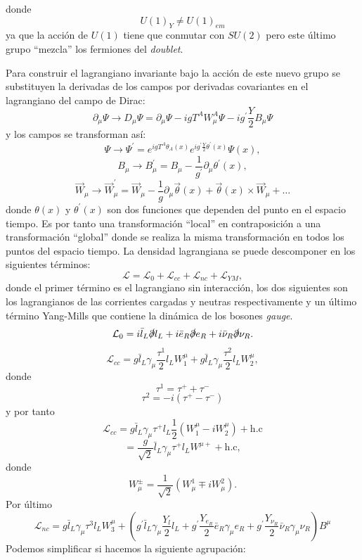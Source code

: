 \documentclass{article}
\theoremstyle{plain}
\theoremstyle{definition}
\begin{document}
	donde \[
	U(1)_Y \neq U(1)_{em}
	\]
	ya que la acción de \(U(1)\) tiene que conmutar con \(SU(2)\) pero este último grupo ``mezcla'' los fermiones  del \textit{doublet}.\par 
	Para construir el lagrangiano invariante bajo la acción de este nuevo grupo se substituyen la derivadas de los campos por derivadas covariantes en el lagrangiano del campo de Dirac:
	\[
	\partial_{\mu}\Psi\rightarrow D_\mu\Psi = \partial_{\mu}\Psi - igT^AW_\mu^A\Psi -ig^\prime \frac{Y}{2}B_\mu\Psi
	\]
	y los campos se transforman así:\[
	\Psi\rightarrow \Psi^\prime = e^{igT^A\theta_A(x)}e^{ig^\prime\frac{Y}{2}\theta^\prime(x)}\Psi(x),
	\]
	\[
	B_\mu\rightarrow B^\prime_\mu = B_\mu -\frac{1}{g^\prime}\partial_{\mu}\theta^\prime(x),
	\]
	\[
	\vec{W}_\mu\rightarrow \vec{W}^\prime_\mu = \vec{W}_\mu -\frac{1}{g}\partial_{\mu}\vec{\theta}(x) + \vec{\theta}(x)\times \vec{W}_\mu + \dots
	\]
	donde \(\theta(x)\) y \(\theta^\prime(x)\) son dos funciones que dependen del punto en el espacio tiempo. Es por tanto una transformación ``local'' en contraposición a una transformación ``global'' donde se realiza la misma transformación en todos los puntos del espacio tiempo.
	La densidad lagrangiana se puede descomponer en los siguientes términos:
	\[
	\mathcal{L} = \mathcal{L}_0 +\mathcal{L}_{cc} +\mathcal{L}_{nc} + \mathcal{L}_{YM},
	\]
	donde el primer término es el lagrangiano sin interacción, los dos siguientes son los lagrangianos de las corrientes cargadas y neutras respectivamente y un último término Yang-Mills que contiene la dinámica de los bosones \textit{gauge}.
	\[
	\mathcal{L}_0 = i\bar{l}_L\slashed{\partial}l_L + i\bar{e}_R\slashed{\partial}e_R +  i\bar{\nu}_R\slashed{\partial}\nu_R\text{.}
	\]
	\[
	\mathcal{L}_{cc} = g\bar{l}_L\gamma_{\mu}\frac{\tau^1}{2}l_LW_1^\mu + g\bar{l}_L\gamma_{\mu}\frac{\tau^2}{2}l_L W_2^\mu,
	\]
	donde \[
	\tau^1 = \tau^+ + \tau^-
	\]
	\[
	\tau^2 = -i\left(\tau^+-\tau^-\right)
	\] y por tanto
	\[
	\mathcal{L}_{cc} = g\bar{l}_L\gamma_{\mu}\tau^+l_L \frac{1}{2}\left(W_1^\mu-iW_2^\mu\right)  + \text{h.c}
	\]
	\[
	= \frac{g}{\sqrt{2}}\bar{l}_L\gamma_{\mu}\tau^+l_LW^{\mu +} + \text{h.c},
	\]
	donde 
	\[
	W_\mu^{\pm} = \frac{1}{\sqrt{2}}\left(W^1_\mu\mp iW_\mu^2 \right)\textit{.}
	\]
	Por último
	\[
		\mathcal{L}_{nc} = g \bar{l}_L \gamma_{\mu}\tau^3 l_L W_3^\mu + \left(g^\prime\bar{l}_L \gamma_{\mu}\frac{Y_l}{2}l_L +  
		g^\prime\frac{Y_{e_R}}{2}\bar{e}_R\gamma_{\mu}e_R +
		g^\prime
		\frac{Y_{\nu_R}}{2}\bar{\nu}_R\gamma_{\mu}\nu_R\right)B^\mu
\]
	Podemos simplificar si hacemos la siguiente agrupación:
\end{document}
